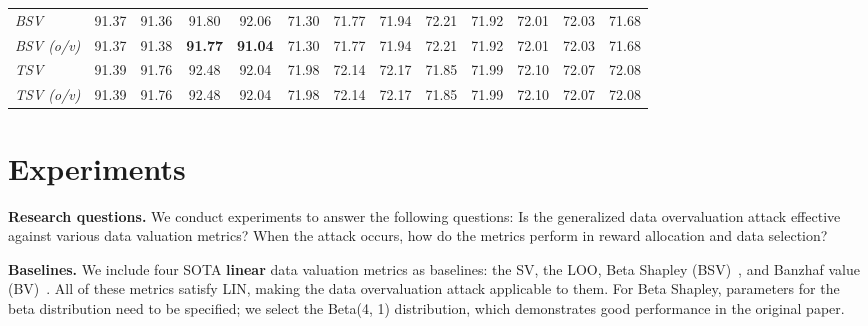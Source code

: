 \begin{table*}[t]
\begin{tabular}{@{}l|cccccccccccc@{}}
\textit{BSV} & 91.37 & 91.36 & 91.80 & \multicolumn{1}{c|}{92.06} & 71.30 & 71.77 & 71.94 & \multicolumn{1}{c|}{72.21} & 71.92 & 72.01 & 72.03 & 71.68 \\
\textit{BSV (o/v)} & 91.37 & 91.38 & \textbf{91.77} & \multicolumn{1}{c|}{\textbf{91.04}} & 71.30 & 71.77 & 71.94 & \multicolumn{1}{c|}{72.21} & 71.92 & 72.01 & 72.03 & 71.68 \\ \midrule
\textit{TSV} & 91.39 & 91.76 & 92.48 & \multicolumn{1}{c|}{92.04} & 71.98 & 72.14 & 72.17 & \multicolumn{1}{c|}{71.85} & 71.99 & 72.10 & 72.07 & 72.08 \\
\textit{TSV (o/v)} & 91.39 & 91.76 & 92.48 & \multicolumn{1}{c|}{92.04} & 71.98 & 72.14 & 72.17 & \multicolumn{1}{c|}{71.85} & 71.99 & 72.10 & 72.07 & 72.08 \\ \bottomrule
\end{tabular}
\end{table*}







\section{Experiments}
\textbf{Research questions.}
We conduct experiments to answer the following questions:
Is the generalized data overvaluation attack effective against various data valuation metrics? When the attack occurs, how do the metrics perform in reward allocation and data selection?

\textbf{Baselines.}
We include four SOTA \textbf{linear} data valuation metrics as baselines: the SV, the LOO, Beta Shapley (BSV)~\citep{kwon2022beta}, and Banzhaf value (BV)~\citep{wang2023data}.
All of these metrics satisfy LIN, making the data overvaluation attack applicable to them. 
For Beta Shapley, parameters for the beta distribution need to be specified; we select the Beta(4, 1) distribution, which demonstrates good performance in the original paper.

